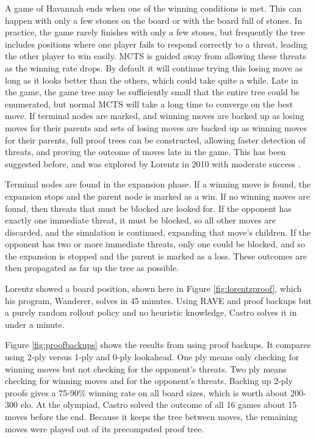A game of Havannah ends when one of the winning conditions is met. This can happen with only a few stones on the board or with the board full of stones. In practice, the game rarely finishes with only a few stones, but frequently the tree includes positions where one player fails to respond correctly to a threat, leading the other player to win easily. MCTS is guided away from allowing these threats as the winning rate drops. By default it will continue trying this losing move as long as it looks better than the others, which could take quite a while. Late in the game, the game tree may be sufficiently small that the entire tree could be enumerated, but normal MCTS will take a long time to converge on the best move. If terminal nodes are marked, and winning moves are backed up as losing moves for their parents and sets of losing moves are backed up as winning moves for their parents, full proof trees can be constructed, allowing faster detection of threats, and proving the outcome of moves late in the game. This has been suggested before, and was explored by Lorentz in 2010 with moderate success \cite{lorentz2011improving}.

Terminal nodes are found in the expansion phase. If a winning move is found, the expansion stops and the parent node is marked as a win. If no winning moves are found, then threats that must be blocked are looked for. If the opponent has exactly one immediate threat, it must be blocked, so all other moves are discarded, and the simulation is continued, expanding that move's children. If the opponent has two or more immediate threats, only one could be blocked, and so the expansion is stopped and the parent is marked as a loss. These outcomes are then propagated as far up the tree as possible.

Lorentz showed a board position, shown here in Figure \ref{fig:lorentzproof}, which his program, Wanderer, solves in 45 minutes. Using RAVE and proof backups but a purely random rollout policy and no heuristic knowledge, Castro solves it in under a minute.

Figure \ref{fig:proofbackups} shows the results from using proof backups. It compares using 2-ply versus 1-ply and 0-ply lookahead. One ply means only checking for winning moves but not checking for the opponent's threats. Two ply means checking for winning moves and for the opponent's threats. Backing up 2-ply proofs gives a 75-90\% winning rate on all board sizes, which is worth about 200-300 elo. At the olympiad, Castro solved the outcome of all 16 games about 15 moves before the end. Because it keeps the tree between moves, the remaining moves were played out of its precomputed proof tree.


